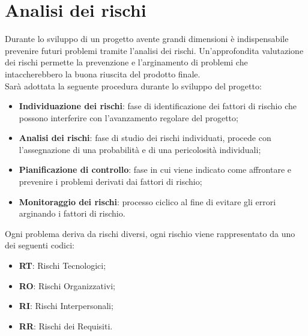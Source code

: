 \section{Analisi dei rischi}

Durante lo sviluppo di un progetto avente grandi dimensioni è indispensabile prevenire 
futuri problemi tramite l'analisi dei rischi. Un'approfondita valutazione dei rischi permette la prevenzione e l'arginamento di problemi che intaccherebbero la buona riuscita del prodotto finale.\\
Sarà adottata la seguente procedura durante lo sviluppo del progetto:

\begin{itemize}
	\item \textbf{Individuazione dei rischi}: fase di identificazione dei fattori di rischio che possono interferire con l'avanzamento regolare del progetto;
	\item \textbf{Analisi dei rischi}: fase di studio dei rischi individuati, procede con l'assegnazione di una probabilità e di una pericolosità individuali;
	\item \textbf{Pianificazione di controllo}: fase in cui viene indicato come affrontare e prevenire
	i problemi derivati dai fattori di rischio;
	\item \textbf{Monitoraggio dei rischi}: processo ciclico al fine di evitare gli errori arginando i 
	fattori di rischio.
\end{itemize}
Ogni problema deriva da rischi diversi, ogni rischio viene rappresentato da uno dei seguenti codici:

\begin{itemize}
	\item \textbf{RT}: Rischi Tecnologici;
	\item \textbf{RO}: Rischi Organizzativi;
	\item \textbf{RI}: Rischi Interpersonali;
	\item \textbf{RR}: Rischi dei Requisiti.
\end{itemize}

